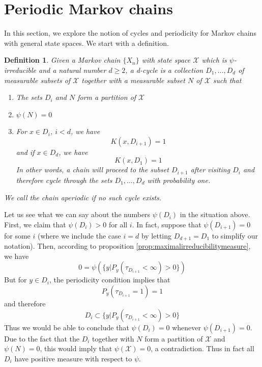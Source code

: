 \documentclass[a4paper, draft]{article}
\theoremstyle{own}
\newtheorem{defn}{Definition}[section]
\theoremstyle{remark}
\begin{document}
\section{Periodic Markov chains}\label{sec:periodicmarkovchains}

In this section, we explore the notion of cycles and periodicity for Markov chains with general state spaces. We start with a definition.

\begin{defn}
	Given a Markov chain $\{ X_n \}$ with state space $\mathcal X$ which is $\psi$-irreducible and a natural number $d \geq 2$, a {\em d-cycle} is a collection $D_1, \dots, D_d$ of measurable subsets of ${\mathcal X}$ together with a measurable subset $N$ of ${\mathcal X}$ such that
	\begin{enumerate}
		\item The sets $D_i$ and $N$ form a partition of ${\mathcal X}$
		\item $\psi(N) = 0$
		\item For $x \in D_i$, $i < d$, we have
		$$
		K(x,D_{i+1}) = 1
		$$
		and if $x \in D_d$, we have
		$$
		K(x,D_1) = 1
		$$
		In other words, a chain will proceed to the subset $D_{i+1}$ after visiting $D_i$ and therefore cycle through the sets $D_1, \dots, D_d$ with probability one.
	\end{enumerate}
	We call the chain {\em aperiodic} if no such cycle exists.
\end{defn}

Let us see what we can say about the numbers $\psi(D_i)$ in the situation above. First, we claim that $\psi(D_i) > 0$ for all $i$. In fact, suppose that $\psi(D_{i+1}) = 0$ for some $i$ (where we include the case $i = d$ by letting $D_{d+1} = D_1$ to simplify our notation). Then, according to
proposition \ref{prop:maximalirreducibilitymeasure}, we have
$$
0 = \psi(\{ y | P_y(\tau_{D_{i+1}} < \infty) > 0 \}) 
$$
But for $y \in D_i$, the periodicity condition implies that
$$
P_y(\tau_{D_{i+1}} = 1) = 1
$$
and therefore
$$
D_i \subset \{ y | P_y(\tau_{D_{i+1}} < \infty) > 0 \}
$$
Thus we would be able to conclude that $\psi(D_i) = 0$ whenever $\psi(D_{i+1}) = 0$. Due to the fact that the $D_i$ together with $N$ form a partition of ${\mathcal X}$ and $\psi(N) = 0$, this would imply that $\psi({\mathcal X}) = 0$, a contradiction. Thus in fact all $D_i$ have positive measure with respect to $\psi$. 
\end{document}
